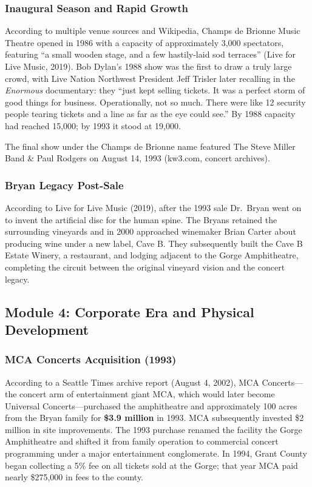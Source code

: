\documentclass[11pt,letterpaper]{article}
\begin{document}
\subsubsection{Inaugural Season and Rapid Growth}

According to multiple venue sources and Wikipedia, Champs de Brionne Music Theatre opened in 1986 with a capacity of approximately 3,000 spectators, featuring ``a small wooden stage, and a few hastily-laid sod terraces'' (Live for Live Music, 2019). Bob Dylan's 1988 show was the first to draw a truly large crowd, with Live Nation Northwest President Jeff Trisler later recalling in the \textit{Enormous} documentary: they ``just kept selling tickets. It was a perfect storm of good things for business. Operationally, not so much. There were like 12 security people tearing tickets and a line as far as the eye could see.'' By 1988 capacity had reached 15,000; by 1993 it stood at 19,000.

The final show under the Champs de Brionne name featured The Steve Miller Band \& Paul Rodgers on August 14, 1993 (kw3.com, concert archives).

\subsubsection{Bryan Legacy Post-Sale}

According to Live for Live Music (2019), after the 1993 sale Dr.\ Bryan went on to invent the artificial disc for the human spine. The Bryans retained the surrounding vineyards and in 2000 approached winemaker Brian Carter about producing wine under a new label, Cave B. They subsequently built the Cave B Estate Winery, a restaurant, and lodging adjacent to the Gorge Amphitheatre, completing the circuit between the original vineyard vision and the concert legacy.

\subsection{Module 4: Corporate Era and Physical Development}

\subsubsection{MCA Concerts Acquisition (1993)}

According to a Seattle Times archive report (August 4, 2002), MCA Concerts---the concert arm of entertainment giant MCA, which would later become Universal Concerts---purchased the amphitheatre and approximately 100 acres from the Bryan family for \textbf{\$3.9 million} in 1993. MCA subsequently invested \$2 million in site improvements. The 1993 purchase renamed the facility the Gorge Amphitheatre and shifted it from family operation to commercial concert programming under a major entertainment conglomerate. In 1994, Grant County began collecting a 5\% fee on all tickets sold at the Gorge; that year MCA paid nearly \$275,000 in fees to the county.
\end{document}
